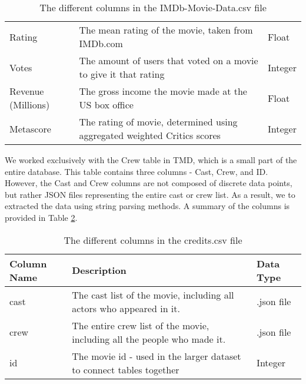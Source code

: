 \begin{table}[h]
\begin{tabular}{lp{10cm}l}
                Rating             & The mean rating of the movie, taken from IMDb.com                          & Float     \\
                Votes              & The amount of users that voted on a movie to give it that rating           & Integer   \\
                Revenue (Millions) & The gross income the movie made at the US box office                       & Float     \\
                Metascore          & The rating of movie, determined using aggregated weighted Critics scores   & Integer   \\
                \bottomrule
            \end{tabular}
            \caption[short]{The different columns in the IMDb-Movie-Data.csv file}\label{tab-IMDb-Movie-Data-Column-Description}
        \end{table}

        We worked exclusively with the Crew table in TMD, which is a small part of
            the entire database. 
        This table contains three columns - Cast, Crew, and ID.
        However, the Cast and Crew columns are not composed of discrete data points, 
            but rather JSON files representing the entire cast or crew list. 
        As a result, we to extracted the data using string parsing methods. 
        A summary of the columns is provided in Table \ref*{tab-Credits-Column-Description}.
        \begin{table}[h]
            \centering
            \begin{tabular}{lp{10cm}l}
                \toprule
                Column Name & Description                                                              & Data Type  \\
                \midrule
                cast        & The cast list of the movie, including all actors who appeared in it.     & .json file \\
                crew        & The entire crew list of the movie, including all the people who made it. & .json file \\
                id          & The movie id - used in the larger dataset to connect tables together     & Integer    \\
                \bottomrule
            \end{tabular}
            \caption[short]{The different columns in the credits.csv file}\label{tab-Credits-Column-Description}
        \end{table}

